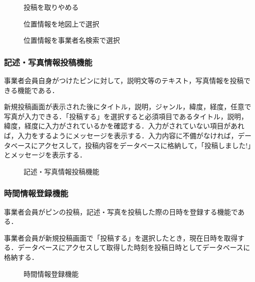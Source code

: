 \begin{figure}[H]
    \centering
    
    \caption{投稿を取りやめる}
    \label{fig:pinpost_bus1_2}
\end{figure}

\begin{figure}[H]
    \centering
    
    \caption{位置情報を地図上で選択}
    \label{fig:pinpost_bus1_3}
\end{figure}

\begin{figure}[H]
    \centering
    
    \caption{位置情報を事業者名検索で選択}
    \label{fig:pinpost_bus1_4}
\end{figure}

\subsubsection{記述・写真情報投稿機能}
事業者会員自身がつけたピンに対して，説明文等のテキスト，写真情報を投稿できる機能である．

新規投稿画面が表示された後にタイトル，説明，ジャンル，緯度，経度，任意で写真が入力できる．「投稿する」を選択すると必須項目であるタイトル，説明，緯度，経度に入力がされているかを確認する．入力がされていない項目があれば，入力をするようにメッセージを表示する．入力内容に不備がなければ，データベースにアクセスして，投稿内容をデータベースに格納して，「投稿しました!」とメッセージを表示する．

\begin{figure}[H]
    \centering
    
    \caption{記述・写真情報投稿機能}
    \label{fig:pinpost_bus2}
\end{figure}

\subsubsection{時間情報登録機能}
事業者会員がピンの投稿，記述・写真を投稿した際の日時を登録する機能である．

事業者会員が新規投稿画面で「投稿する」を選択したとき，現在日時を取得する．データベースにアクセスして取得した時刻を投稿日時としてデータベースに格納する．
\begin{figure}[H]
    \centering
    
    \caption{時間情報登録機能}
    \label{fig:pinpost_bus3}
\end{figure}

